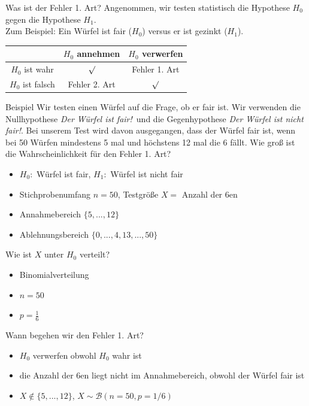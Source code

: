 \documentclass[t,11pt,aspectratio=169]{beamer}
\begin{document}
	
\begin{frame}{Was ist der Fehler 1. Art?}
Angenommen, wir testen statistisch die Hypothese $H_0$ gegen die Hypothese $H_1$.\\
Zum Beispiel: Ein Würfel ist fair ($H_0$) versus er ist gezinkt ($H_1$).
\pause
\vfill
\begin{center}
	\renewcommand{\arraystretch}{2.5}
	\begin{tabular}{c|c|c}
		& $H_0$ annehmen & $H_0$ verwerfen \\
		\hline
		$H_0$ ist wahr &  $\surd$  & Fehler 1. Art \\
		\hline
		$H_0$ ist falsch & Fehler 2. Art &  $\surd$ \\
	\end{tabular}
\end{center}
\vfill
\end{frame}

\begin{frame}
\begin{block}{Beispiel}
	Wir testen einen Würfel auf die Frage, ob er fair ist. Wir verwenden die Nullhypothese \glqq \textit{Der Würfel ist fair!}\grqq\ und die Gegenhypothese \glqq \textit{Der Würfel ist nicht fair!}\grqq. Bei unserem Test wird davon ausgegangen, dass der Würfel fair ist, wenn bei 50 Würfen mindestens 5 mal und höchstens 12 mal die 6 fällt. Wie groß ist die Wahrscheinlichkeit für den Fehler 1. Art?
\end{block}
\pause
\begin{itemize}
	\item $H_0:$ Würfel ist fair, $H_1:$ Würfel ist nicht fair
	\item Stichprobenumfang $n=50$, Testgröße $X=$ Anzahl der 6en
	\item Annahmebereich $\{ 5,...,12 \}$
	\item Ablehnungsbereich $\{ 0,...,4,13,...,50 \}$
\end{itemize}
\end{frame}

\begin{frame}{Wie ist $X$ unter $H_0$ verteilt?}
\begin{itemize}
\item Binomialverteilung
\item $n=50$
\item $p=\frac{1}{6}$
\end{itemize}
\pause
\vfill
\begin{center}
	 Wann begehen wir den Fehler 1. Art?
\end{center}
\vfill
\begin{itemize}
\item $H_0$ verwerfen obwohl $H_0$ wahr ist
\item die Anzahl der 6en liegt nicht im Annahmebereich, obwohl der Würfel fair ist
\item $X\notin \{ 5,...,12 \}$, $X\sim \mathcal{B}(n=50,p=1/6)$
\end{itemize}
\end{frame}
\end{document}
